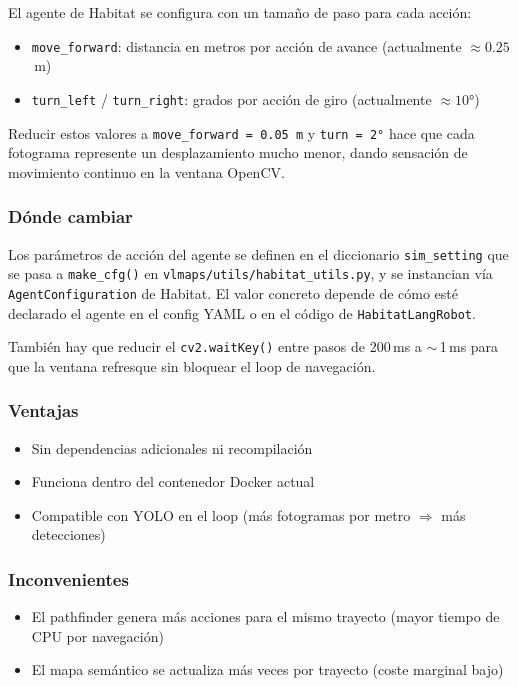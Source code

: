 \documentclass[11pt,a4paper]{article}
\begin{document}
El agente de Habitat se configura con un tamaño de paso para cada acción:
\begin{itemize}
    \item \texttt{move\_forward}: distancia en metros por acción de avance (actualmente $\approx 0.25$\,m)
    \item \texttt{turn\_left} / \texttt{turn\_right}: grados por acción de giro (actualmente $\approx 10°$)
\end{itemize}

Reducir estos valores a \texttt{move\_forward = 0.05\,m} y \texttt{turn = 2°} hace que cada fotograma represente un desplazamiento mucho menor, dando sensación de movimiento continuo en la ventana OpenCV.

\subsubsection*{Dónde cambiar}

Los parámetros de acción del agente se definen en el diccionario \texttt{sim\_setting} que se pasa a \texttt{make\_cfg()} en \texttt{vlmaps/utils/habitat\_utils.py}, y se instancian vía \texttt{AgentConfiguration} de Habitat. El valor concreto depende de cómo esté declarado el agente en el config YAML o en el código de \texttt{HabitatLangRobot}.

También hay que reducir el \texttt{cv2.waitKey()} entre pasos de 200\,ms a $\sim$\,1\,ms para que la ventana refresque sin bloquear el loop de navegación.

\subsubsection*{Ventajas}
\begin{itemize}
    \item Sin dependencias adicionales ni recompilación
    \item Funciona dentro del contenedor Docker actual
    \item Compatible con YOLO en el loop (más fotogramas por metro $\Rightarrow$ más detecciones)
\end{itemize}

\subsubsection*{Inconvenientes}
\begin{itemize}
    \item El pathfinder genera más acciones para el mismo trayecto (mayor tiempo de CPU por navegación)
    \item El mapa semántico se actualiza más veces por trayecto (coste marginal bajo)
\end{itemize}
\end{document}
